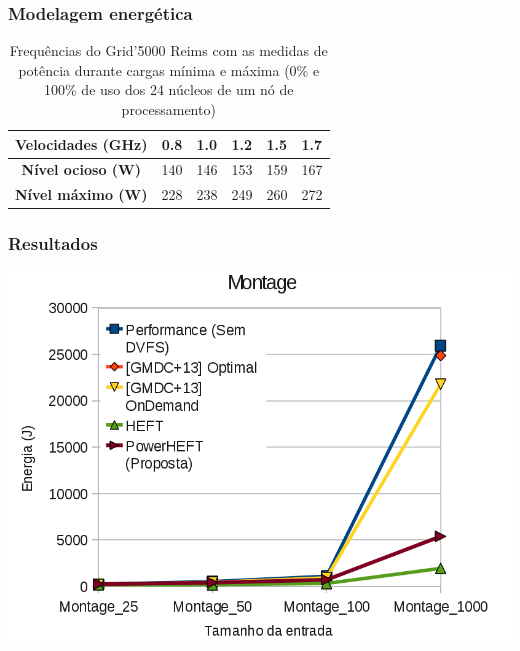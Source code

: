 \documentclass{beamer}
\begin{document}
\begin{frame}
\frametitle{Modelagem energética}

\begin{table}
    \begin{tabular}{c|cllll}
    \hline
    \textbf{Velocidades (GHz)} & \textbf{0.8} & \textbf{1.0} & \textbf{1.2} & \textbf{1.5} & \textbf{1.7} \\ \hline
    \textbf{Nível ocioso (W)}       & 140          & 146          & 153          & 159          & 167          \\
    \textbf{Nível máximo (W)}  & 228          & 238          & 249          & 260          & 272          \\ \hline
    \end{tabular}
    \caption{Frequências do Grid'5000 Reims com as medidas de potência durante
    cargas mínima e máxima (0\% e 100\% de uso dos 24 núcleos de um nó de processamento)
    \cite{guerout:energy_aware_simulation}}
\end{table}


\end{frame}


\begin{frame}
\frametitle{Resultados}
	\begin{center}
		\includegraphics[width=0.9\columnwidth]{Montage.png}
	\end{center}
\end{frame}
\end{document}
